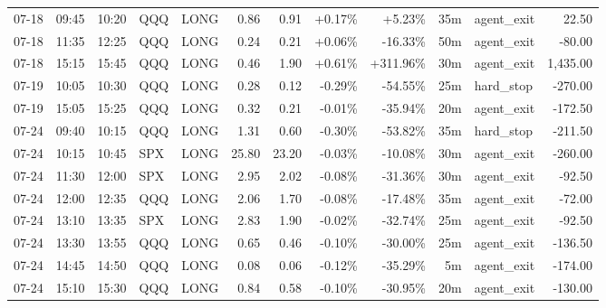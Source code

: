 \documentclass[11pt,a4paper,twoside]{article}
\begin{document}
\begin{center}
\begin{longtable}{>{\color{txtmain}}l l l l l r r r r r >{\color{txtmain}}l r}
07-18 & 09:45 & 10:20 & QQQ & LONG & 0.86 & 0.91 & \textcolor{wingreen}{+0.17\%} & \textcolor{wingreen}{+5.23\%} & 35m & agent\_exit & \textcolor{wingreen}{22.50} \\
07-18 & 11:35 & 12:25 & QQQ & LONG & 0.24 & 0.21 & \textcolor{wingreen}{+0.06\%} & \textcolor{lossred}{-16.33\%} & 50m & agent\_exit & \textcolor{lossred}{-80.00} \\
07-18 & 15:15 & 15:45 & QQQ & LONG & 0.46 & 1.90 & \textcolor{wingreen}{+0.61\%} & \textcolor{wingreen}{+311.96\%} & 30m & agent\_exit & \textcolor{wingreen}{1,435.00} \\
07-19 & 10:05 & 10:30 & QQQ & LONG & 0.28 & 0.12 & \textcolor{lossred}{-0.29\%} & \textcolor{lossred}{-54.55\%} & 25m & hard\_stop & \textcolor{lossred}{-270.00} \\
07-19 & 15:05 & 15:25 & QQQ & LONG & 0.32 & 0.21 & \textcolor{lossred}{-0.01\%} & \textcolor{lossred}{-35.94\%} & 20m & agent\_exit & \textcolor{lossred}{-172.50} \\
07-24 & 09:40 & 10:15 & QQQ & LONG & 1.31 & 0.60 & \textcolor{lossred}{-0.30\%} & \textcolor{lossred}{-53.82\%} & 35m & hard\_stop & \textcolor{lossred}{-211.50} \\
07-24 & 10:15 & 10:45 & SPX & LONG & 25.80 & 23.20 & \textcolor{lossred}{-0.03\%} & \textcolor{lossred}{-10.08\%} & 30m & agent\_exit & \textcolor{lossred}{-260.00} \\
07-24 & 11:30 & 12:00 & SPX & LONG & 2.95 & 2.02 & \textcolor{lossred}{-0.08\%} & \textcolor{lossred}{-31.36\%} & 30m & agent\_exit & \textcolor{lossred}{-92.50} \\
07-24 & 12:00 & 12:35 & QQQ & LONG & 2.06 & 1.70 & \textcolor{lossred}{-0.08\%} & \textcolor{lossred}{-17.48\%} & 35m & agent\_exit & \textcolor{lossred}{-72.00} \\
07-24 & 13:10 & 13:35 & SPX & LONG & 2.83 & 1.90 & \textcolor{lossred}{-0.02\%} & \textcolor{lossred}{-32.74\%} & 25m & agent\_exit & \textcolor{lossred}{-92.50} \\
07-24 & 13:30 & 13:55 & QQQ & LONG & 0.65 & 0.46 & \textcolor{lossred}{-0.10\%} & \textcolor{lossred}{-30.00\%} & 25m & agent\_exit & \textcolor{lossred}{-136.50} \\
07-24 & 14:45 & 14:50 & QQQ & LONG & 0.08 & 0.06 & \textcolor{lossred}{-0.12\%} & \textcolor{lossred}{-35.29\%} & 5m & agent\_exit & \textcolor{lossred}{-174.00} \\
07-24 & 15:10 & 15:30 & QQQ & LONG & 0.84 & 0.58 & \textcolor{lossred}{-0.10\%} & \textcolor{lossred}{-30.95\%} & 20m & agent\_exit & \textcolor{lossred}{-130.00} \\

\end{longtable}
\end{center}
\end{document}
